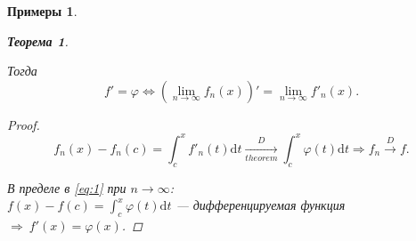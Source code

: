 \documentclass[a4paper, 12pt]{article}
\newtheorem{Examples}{Примеры}
\newtheorem{Thm}{Теорема}
\begin{document}
\begin{Examples}
\begin{enumerate}
\begin{Thm}
\begin{enumerate}
                    \end{enumerate}
                    Тогда
                    \[f' = \varphi
                    \Leftrightarrow (\lim_{n \rightarrow \infty} f_n(x))' =
                    \lim_{n \rightarrow \infty} f'_n(x).\]

                    \begin{proof}
                        \begin{equation} \label{eq:1}
                            f_n(x) - f_n(c) = \int^{x}_{c} f'_n(t)\mathrm{d}t
                            \underset{theorem}{\xrightarrow{D}}
                            \int^{x}_{c} \varphi(t)\mathrm{d}t \Rightarrow f_n
                            \xrightarrow{D} f.
                        \end{equation}

                        В пределе в \eqref{eq:1} при \(n \rightarrow \infty\):\\
                        \(f(x) - f(c) = \int^{x}_{c} \varphi(t)\mathrm{d}t\) --- дифференцируемая функция
                        \( \Rightarrow\ f'(x) = \varphi(x)\).
                    \end{proof}
                \end{Thm}
         \end{enumerate}
    \end{Examples}
\end{document}
